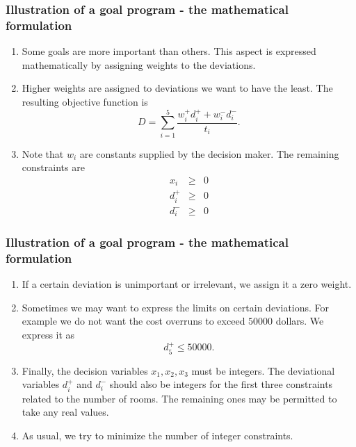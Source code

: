 \documentclass{beamer}
\begin{document}
\begin{frame}
\frametitle{Illustration of a goal program - the mathematical formulation}
\begin{enumerate}
\item Some goals are more important than others. This aspect is expressed 
mathematically by assigning weights to the deviations.
\item Higher weights are assigned to deviations we want to have the least. The
resulting objective function is
\begin{equation}\label{e11}
D = \sum_{i=1}^5 \frac{w_i^+d_i^+ + w_i^-d_i^-}{t_i}.
\end{equation}
\item Note that $w_i$ are constants supplied by the decision maker. The 
remaining constraints are
\begin{eqnarray}
x_i &\ge& 0 \label{e12} \\
d_i^+ &\ge& 0 \label{e13} \\
d_i^- &\ge& 0 \label{e14}
\end{eqnarray}
\end{enumerate}
\end{frame}

\begin{frame}
\frametitle{Illustration of a goal program - the mathematical formulation}
\begin{enumerate}
\item If a certain deviation is unimportant or irrelevant, we assign it a
zero weight.
\item Sometimes we may want to express the limits on certain deviations. For 
example we do not want the cost overruns to exceed $50000$ dollars. We express 
it as
\begin{equation}\label{e15}
d_5^+ \le 50000.
\end{equation}
\item Finally, the decision variables $x_1, x_2, x_3$ must be integers. The
deviational variables $d_i^+$ and $d_i^-$ should also be integers for the
first three constraints related to the number of rooms. The remaining ones may
be permitted to take any real values.
\item As usual, we try to minimize the number of integer constraints.
\end{enumerate}
\end{frame}
\end{document}
